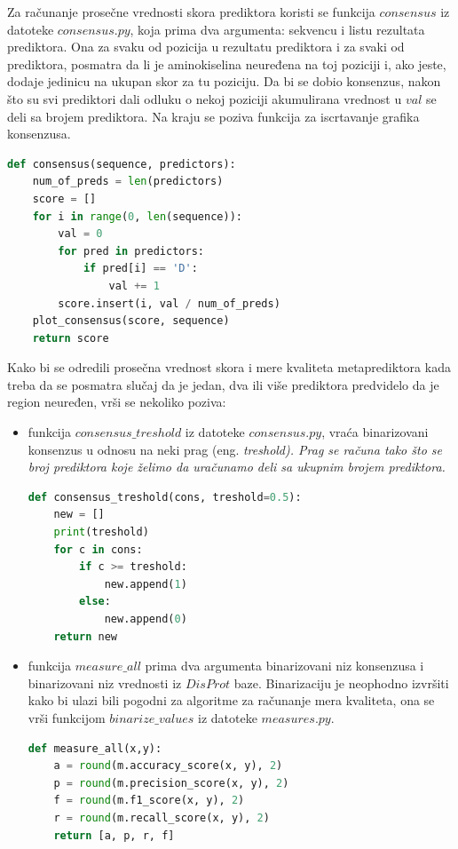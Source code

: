 \begin{enumerate}
\begin{lstlisting}[language=Python]
\end{lstlisting}
Za računanje prosečne vrednosti skora prediktora koristi se funkcija $consensus$ iz datoteke $consensus.py$, koja prima dva argumenta: sekvencu i listu rezultata prediktora. Ona za svaku od pozicija u rezultatu prediktora i za svaki od prediktora, posmatra da li je aminokiselina neuređena na toj poziciji i, ako jeste, dodaje jedinicu na ukupan skor za tu poziciju. Da bi se dobio konsenzus, nakon što su svi prediktori dali odluku o nekoj poziciji akumulirana vrednost u $val$ se deli sa brojem prediktora. Na kraju se poziva funkcija za iscrtavanje grafika konsenzusa.
\begin{lstlisting}[language=Python]
def consensus(sequence, predictors):
    num_of_preds = len(predictors)
    score = []
    for i in range(0, len(sequence)):
        val = 0
        for pred in predictors:
            if pred[i] == 'D':
                val += 1
        score.insert(i, val / num_of_preds)
    plot_consensus(score, sequence)
    return score
\end{lstlisting}
Kako bi se odredili prosečna vrednost skora i mere kvaliteta metaprediktora kada treba da se posmatra slučaj da je jedan, dva ili više prediktora predvidelo da je region neuređen, vrši se nekoliko poziva:
\begin{itemize}
\item funkcija $consensus\_treshold$ iz datoteke $consensus.py$, vraća binarizovani konsenzus u odnosu na neki prag (eng. \em{treshold}). Prag se računa tako što se broj prediktora koje želimo da uračunamo deli sa ukupnim brojem prediktora. 
\begin{lstlisting}[language=Python]
def consensus_treshold(cons, treshold=0.5):
    new = []
    print(treshold)
    for c in cons:
        if c >= treshold:
            new.append(1)
        else:
            new.append(0)
    return new
\end{lstlisting}
\item funkcija $measure\_all$ prima dva argumenta binarizovani niz konsenzusa i binarizovani niz vrednosti iz $DisProt$ baze. Binarizaciju je neophodno izvršiti kako bi ulazi bili pogodni za algoritme za računanje mera kvaliteta, ona se vrši funkcijom $binarize\_values$ iz datoteke $measures.py$.
\begin{lstlisting}[language=Python]
def measure_all(x,y):
    a = round(m.accuracy_score(x, y), 2)
    p = round(m.precision_score(x, y), 2)
    f = round(m.f1_score(x, y), 2)
    r = round(m.recall_score(x, y), 2)
    return [a, p, r, f]
    

\end{lstlisting}
\end{itemize}
\end{enumerate}
